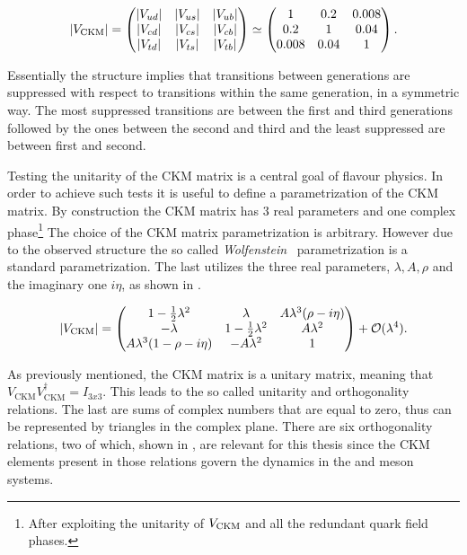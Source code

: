 \begin{equation}
  |V_{\text{CKM}}|
                   = \begin{pmatrix} |V_{ud}| & |V_{us}| & |V_{ub}| \\ |V_{cd}| & |V_{cs}| & |V_{cb}| \\ |V_{td}| & |V_{ts}| & |V_{tb}| \end{pmatrix}
              \simeq \begin{pmatrix} 1 & 0.2 & 0.008 \\ 0.2 & 1 & 0.04 \\ 0.008 & 0.04 & 1 \end{pmatrix}.
      \label{CKMmatrix}
  \end{equation}

\noindent Essentially the structure implies that transitions between generations
are suppressed with respect to transitions within the same generation, in a symmetric way. The most suppressed transitions are between
the first and third generations followed by the ones between the second and third and the least suppressed are between first and second.

Testing the unitarity of the CKM matrix is a central goal of flavour physics.
In order to achieve such tests it is useful to define a parametrization of the CKM matrix. By construction the CKM matrix has
3 real parameters and one complex phase\footnote{After exploiting the unitarity of $V_{\rm CKM}$ and all the redundant quark field phases.}
The choice of the CKM matrix parametrization is \aprior arbitrary. However due to the observed structure the so called
{\it Wolfenstein}~\cite{Wolfenstein:1983yz,Buras-wolfenstein} parametrization is a standard parametrization. The last
utilizes the three real parameters, $\lambda,A,\rho$ and the imaginary one $i\eta$, as shown in .

\begin{equation}
\centering
  |V_{\text{CKM}}|
                   = \begin{pmatrix} \VudWolf & \VusWolf & \VubWolf \\
                                     \VcdWolf & \VcsWolf & \VcbWolf \\
                                     \VtdWolf & \VtsWolf & \VtbWolf \end{pmatrix} + \mathcal{O}(\lambda^4).
      \label{CKMwolfenstein}
\end{equation}

\noindent As previously mentioned, the CKM matrix is a unitary matrix, meaning that $V_{\text{CKM}} V_{\text{CKM}}^\dagger = I_{3x3}$.
This leads to the so called unitarity and orthogonality relations. The last are sums of complex numbers that are equal to zero, thus can be
represented by triangles in the complex plane. There are six orthogonality relations, two of which, shown in , are
relevant for this thesis since the CKM elements present in those relations govern the dynamics in the \Bs and \Bd meson systems.


